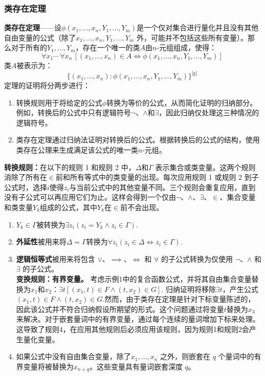 \subsubsection{类存在定理}
\textbf{类存在定理}——设\( \phi(x_1, \dots, x_n, Y_1, \dots, Y_m) \)是一个仅对集合进行量化并且没有其他自由变量的公式（除了\( x_1, \dots, x_n, Y_1, \dots, Y_m \) 外，可能并不包括这些所有变量）。那么对于所有的\( Y_1, \dots, Y_m \)，存在一个唯一的类\( A \)由\( n \)-元组组成，使得：
\[
\forall x_1 \cdots \, \forall x_n \, [(x_1, \dots, x_n) \in A \iff \phi(x_1, \dots, x_n, Y_1, \dots, Y_m)]~
\]
类\( A \)被表示为：
\[
\{(x_1, \dots, x_n) : \phi(x_1, \dots, x_n, Y_1, \dots, Y_m)\}^\text{[g]}~
\]  
定理的证明将分两步进行：
\begin{enumerate}
\item 转换规则用于将给定的公式\( \phi \)转换为等价的公式，从而简化证明的归纳部分。例如，转换后的公式中只有逻辑符号\( \neg \)、\( \land \)和\( \exists \)，因此归纳仅处理这三种情况的逻辑符号。
\item 类存在定理通过归纳法证明对转换后的公式。根据转换后的公式的结构，使用类存在公理来生成满足该公式的唯一类\( n \)-元组。
\end{enumerate}
\textbf{转换规则：}在以下的规则 1 和规则 2 中，\( \Delta \)和\( \Gamma \) 表示集合或类变量。这两个规则消除了所有在\( \in \)前和所有等式中的类变量的出现。每次应用规则 1 或规则 2 到子公式时，选择\( i \)使得\( z_i \)与当前公式中的其他变量不同。三个规则会重复应用，直到没有子公式可以再应用它们为止。这样会得到一个仅由\( \neg \)、\( \land \)、\( \exists \)、\( \in \)、集合变量和类变量\( Y_k \)组成的公式，其中\( Y_k \)在\( \in \)前不会出现。
\begin{enumerate}
\item \(\displaystyle Y_{k}\in \Gamma\)被转换为\(\exists z_{i} (z_{i} = Y_{k} \land z_{i} \in \Gamma)\). 
\item \textbf{外延性}被用来将\(\Delta = \Gamma\)转换为\(\forall z_{i} (z_{i} \in \Delta \iff z_{i} \in \Gamma)\).
\item \textbf{逻辑恒等式}被用来将包含 \( \lor \)、\( \implies \)、\( \iff \) 和 \( \forall \) 的子公式转换为仅使用 \( \neg \)、\( \land \) 和 \( \exists \) 的子公式。\\
\textbf{变换规则：有界变量。} 考虑示例1中的复合函数公式，并将其自由集合变量替换为\(x_1\)和\(x_2\)：\(\exists t \left[ (x_1, t) \in F \land (t, x_2) \in G \right]\). 归纳证明将移除\( \exists t \)，产生公式\((x_1, t) \in F \land (t, x_2) \in G\).然而，由于类存在定理是针对下标变量陈述的，因此该公式并不符合归纳假设所期望的形式。这个问题通过将变量\( t \)替换为\( x_3 \)来解决。对于嵌套量词中的有界变量，通过每个连续的量词增加下标来处理。这导致了规则4，在应用其他规则后必须应用该规则，因为规则1和规则2会产生量化变量。
\item 如果公式中没有自由集合变量，除了\(x_1, \dots, x_n\) 之外，则嵌套在 \(q\) 个量词中的有界变量将被替换为\(x_{n+q}\)。这些变量具有量词嵌套深度 \(q\)。
\end{enumerate}
